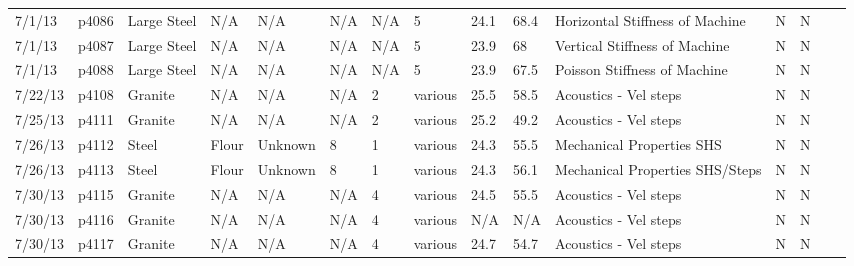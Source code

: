 \begin{landscape}
\begin{longtable}{lllllllllllllll}
7/1/13   & p4086      & Large Steel      & N/A          & N/A          & N/A       & N/A           & 5                            & 24.1        & 68.4     & Horizontal Stiffness of Machine                 & N     & N    &  &  \\
7/1/13   & p4087      & Large Steel      & N/A          & N/A          & N/A       & N/A           & 5                            & 23.9        & 68       & Vertical Stiffness of Machine                   & N     & N    &  &  \\
7/1/13   & p4088      & Large Steel      & N/A          & N/A          & N/A       & N/A           & 5                            & 23.9        & 67.5     & Poisson Stiffness of Machine                    & N     & N    &  &  \\
7/22/13  & p4108      & Granite          & N/A          & N/A          & N/A       & 2             & various                      & 25.5        & 58.5     & Acoustics - Vel steps                           & N     & N    &  &  \\
7/25/13  & p4111      & Granite          & N/A          & N/A          & N/A       & 2             & various                      & 25.2        & 49.2     & Acoustics - Vel steps                           & N     & N    &  &  \\
7/26/13  & p4112      & Steel            & Flour        & Unknown      & 8         & 1             & various                      & 24.3        & 55.5     & Mechanical Properties SHS                       & N     & N    &  &  \\
7/26/13  & p4113      & Steel            & Flour        & Unknown      & 8         & 1             & various                      & 24.3        & 56.1     & Mechanical Properties SHS/Steps                 & N     & N    &  &  \\
7/30/13  & p4115      & Granite          & N/A          & N/A          & N/A       & 4             & various                      & 24.5        & 55.5     & Acoustics - Vel steps                           & N     & N    &  &  \\
7/30/13  & p4116      & Granite          & N/A          & N/A          & N/A       & 4             & various                      & N/A         & N/A      & Acoustics - Vel steps                           & N     & N    &  &  \\
7/30/13  & p4117      & Granite          & N/A          & N/A          & N/A       & 4             & various                      & 24.7        & 54.7     & Acoustics - Vel steps                           & N     & N    &  &  \\

\end{longtable}
\end{landscape}
